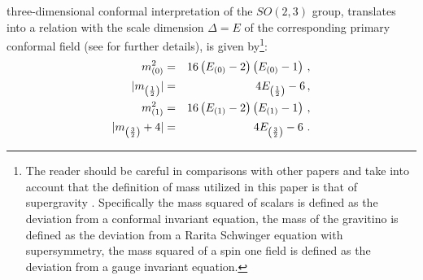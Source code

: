 \documentclass[a4paper,11pt]{article}
\begin{document}
three-dimensional conformal interpretation of the $SO(2,3)$ group,
translates into a relation with the scale dimension $\Delta=E$ of
the corresponding primary conformal field (see \cite{Osp} for
further details), is given by\footnote{The reader should be
careful in comparisons with other papers and take into account
that the definition of mass utilized in this paper is that of
supergravity \cite{castdauriafre}. Specifically the mass squared
of scalars is defined as the deviation from a conformal invariant
equation, the mass of the gravitino is defined as the deviation
from a Rarita Schwinger equation with supersymmetry, the mass
squared of a spin one field is defined as the deviation from a
gauge invariant equation.}:
\begin{eqnarray}
m_{\left(0\right)}^2&=&16\left(E_{\left(0\right)}-2\right)
\left(E_{\left(0\right)}-1\right) \,,\nonumber\\ |m_{\left(1\over
2\right)}|&=&4E_{\left(1\over 2\right)}-6\,,\nonumber\\
m_{\left(1\right)}^2&=&16\left(E_{\left(1\right)}-2\right)
\left(E_{\left(1\right)}-1\right) \,,\nonumber\\ |m_{\left(3\over
2\right)}+4|&=&4E_{\left(3\over 2\right)}-6~. \label{massenergy}
\end{eqnarray}
%
\end{document}
